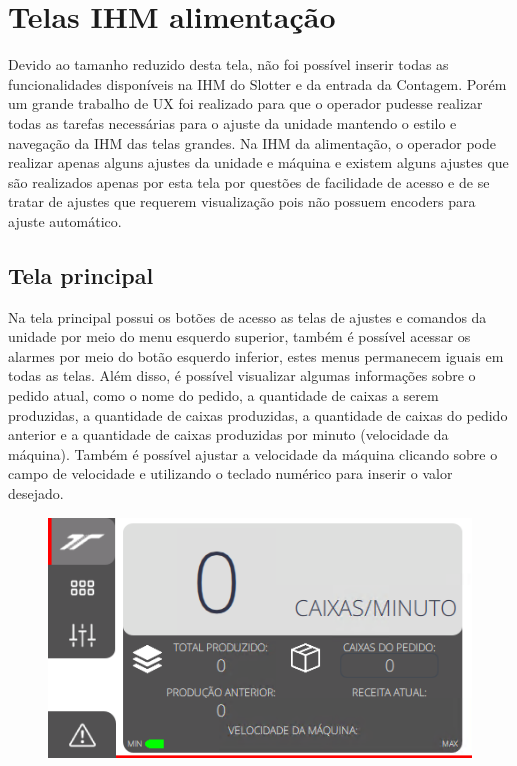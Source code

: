 \thispagestyle{fancy}
\vspace*{40 pt}
\section{Telas IHM alimentação}
Devido ao tamanho reduzido desta tela, não foi possível inserir todas as funcionalidades disponíveis na IHM do Slotter e da entrada da Contagem.
 Porém um grande trabalho de UX foi realizado para que o operador pudesse realizar todas as tarefas necessárias para o ajuste da unidade mantendo
 o estilo e navegação da IHM das telas grandes. Na IHM da alimentação, o operador pode realizar apenas alguns ajustes da unidade e máquina e existem
 alguns ajustes que são realizados apenas por esta tela por questões de facilidade de acesso e de se tratar de ajustes que requerem visualização pois
 não possuem encoders para ajuste automático.
 
\subsection{\small{Tela principal}}\label{ihmAlimentacaoTelaPrincipal}

Na tela principal possui os botões de acesso as telas de ajustes e comandos da unidade por meio do menu esquerdo superior, também é possível acessar
os alarmes por meio do botão esquerdo inferior, estes menus permanecem iguais em todas as telas. Além disso, é possível visualizar algumas informações 
sobre o pedido atual, como o nome do pedido, a quantidade de caixas a serem produzidas, a quantidade de caixas produzidas, a quantidade de caixas
do pedido anterior e a quantidade de caixas produzidas por minuto (velocidade da máquina). Também é possível ajustar a velocidade da máquina clicando
sobre o campo de velocidade e utilizando o teclado numérico para inserir o valor desejado.

\vspace*{\fill}
\begin{figure}[h]
  \centering
  \includegraphics{src/imagesFlexo/11-IHMALM/e-1.png}
\end{figure}
\vspace*{\fill}

